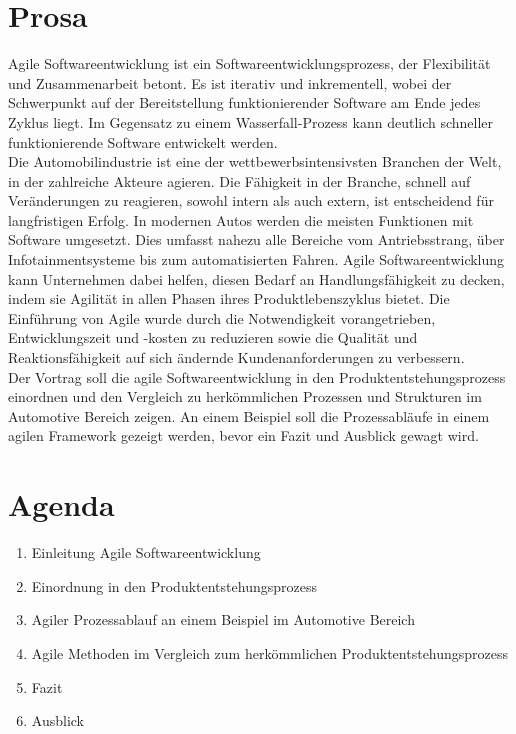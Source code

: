 \section*{Prosa}\label{prosa}
Agile Softwareentwicklung ist ein Softwareentwicklungsprozess, der Flexibilität und Zusammenarbeit betont. Es ist iterativ und inkrementell, wobei der Schwerpunkt auf der Bereitstellung funktionierender Software am Ende jedes Zyklus liegt. Im Gegensatz zu einem Wasserfall-Prozess kann deutlich schneller funktionierende Software entwickelt werden.\\

Die Automobilindustrie ist eine der wettbewerbsintensivsten Branchen der Welt, in der zahlreiche Akteure agieren. Die Fähigkeit in der Branche, schnell auf Veränderungen zu reagieren, sowohl intern als auch extern, ist entscheidend für langfristigen Erfolg. In modernen Autos werden die meisten Funktionen mit Software umgesetzt. Dies umfasst nahezu alle Bereiche vom Antriebsstrang, über Infotainmentsysteme bis zum automatisierten Fahren. Agile Softwareentwicklung kann Unternehmen dabei helfen, diesen Bedarf an Handlungsfähigkeit zu decken, indem sie Agilität in allen Phasen ihres Produktlebenszyklus bietet. Die Einführung von Agile wurde durch die Notwendigkeit vorangetrieben, Entwicklungszeit und -kosten zu reduzieren sowie die Qualität und Reaktionsfähigkeit auf sich ändernde Kundenanforderungen zu verbessern. \cite{Schlosser2016} \cite{katumba2014}\\

Der Vortrag \glqq\titleDocument\grqq{} soll die agile Softwareentwicklung in den Produktentstehungsprozess einordnen und den Vergleich zu herkömmlichen Prozessen und Strukturen im Automotive Bereich zeigen. An einem Beispiel soll die Prozessabläufe in einem agilen Framework gezeigt werden, bevor ein Fazit und Ausblick gewagt wird.\\

\section*{Agenda}
\begin{enumerate}
	\item Einleitung Agile Softwareentwicklung
	\item Einordnung in den Produktentstehungsprozess
	\item Agiler Prozessablauf an einem Beispiel im Automotive Bereich
	\item Agile Methoden im Vergleich zum herkömmlichen Produktentstehungsprozess
	\item Fazit
	\item Ausblick
\end{enumerate}